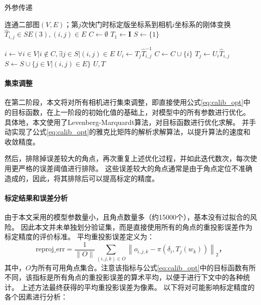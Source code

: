 \begin{algorithm}[t]
    \caption{外参传递}
    \label{alg:calib_init}
    \begin{algorithmic}[1]
        \Require 连通二部图$(V,E)$；第$j$次快门时标定版坐标系到相机$i$坐标系的刚体变换$\hat{T}_{i,j}\in SE(3),(i,j)\in E$
            \State $C \gets \emptyset$
            \State $T_{1} \gets \mathbf{I}$
            \State $S \gets \{1\}$

                \State $i \gets \forall i\in V| i\notin C, \exists j\in S| (i,j)\in E$
                \State $U_{i} \gets T_{j}\hat{T}_{i,j}^{-1}$
                \State $C \gets C \cup \{i\}$
                    \State $T_{j} \gets U_{i}\hat{T}_{i,j}$
                \EndFor
                \State $S \gets S \cup \{j\in V| (i,j)\in E\}$
            \EndWhile
            \State \Return $U, T$
        \EndProcedure
    \end{algorithmic}
\end{algorithm}

\paragraph{集束调整}在第二阶段，本文将对所有相机进行集束调整，即直接使用公式\eqref{eq:calib_opt}中的目标函数，在上一阶段的初始化值的基础上，对模型中的所有参数进行优化。
具体地，本文使用了Levenberg-Marquardt算法\cite{lm}，对目标函数进行优化求解。
并手动实现了公式\eqref{eq:calib_opt}的雅克比矩阵的解析求解算法，以提升算法的速度和收敛精度。

然后，排除掉误差较大的角点，再次重复上述优化过程，并如此迭代数次，每次使用更严格的误差阈值进行排除。
这些误差较大的角点通常是由于角点定位不准确造成的，因此，将其排除后可以提高标定的精度。

\paragraph{标定结果和误差分析}

由于本文采用的模型参数量小，且角点数量多（约15000个），基本没有过拟合的风险。
因此本文并未单独划分验证集，而是直接使用所有的角点的重投影误差作为标定精度的评价标准。
平均重投影误差定义为：
\begin{equation}
    \label{eq:reproj_err}
    \text{reproj\_err} = \frac{1}{\|O\|}\sum_{(i,j,k)\in O}\left\|o_{i,j,k} - \pi\left(\delta_i, T_j(w_k)\right)\right\|_2
    \text{，}
\end{equation}
其中，$O$为所有可用角点集合。注意该指标与公式\eqref{eq:calib_opt}中的目标函数有所不同，该指标是所有角点的重投影误差的算术平均，以便于进行下文中的各种统计。
上述方法最终获得的平均重投影误差为像素。
以下将对可能影响标定精度的各个因素进行分析：

